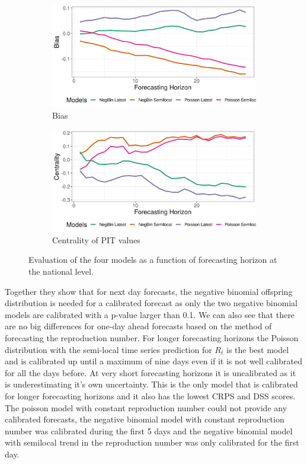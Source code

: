 \documentclass[12pt]{article}
\begin{document}
\begin{figure}[h!]
\begin{subfigure}{0.5\textwidth}
  \centering
  \includegraphics[width=\linewidth]{../output/national_bias.png}  
  \caption{Bias}
  \label{fig:sub-third}
\end{subfigure}
\begin{subfigure}{0.5\textwidth}
  \centering
  \includegraphics[width=\linewidth]{../output/national_centrality.png}  
  \caption{Centrality of PIT values}
  \label{fig:nat_scores_4}
\end{subfigure}
  \caption{Evaluation of the four models as a function of forecasting horizon at the national level.}

  \label{fig:national_scores}
\end{figure}

Together they show that for next day forecasts, the negative binomial offspring distribution is needed for a calibrated forecast as only the two negative binomial models are calibrated with a p-value larger than 0.1. We can also see that there are no big differences for one-day ahead forecasts based on the method of forecasting the reproduction number. For longer forecasting horizons the Poisson distribution with the semi-local time series prediction for $R_t$ is the best model and is calibrated up until a maximum of nine days even if it is not well calibrated for all the days before. At very short forecasting horizons it is uncalibrated as it is underestimating it's own uncertainty. This is the only model that is calibrated for longer forecasting horizons and it also has the lowest CRPS and DSS scores. The poisson model with constant reproduction number could not provide any calibrated forecasts, the negative binomial model with constant reproduction number was calibrated during the first 5 days and the negative binomial model with semilocal trend in the reproduction number was only calibrated for the first day.
\end{document}
